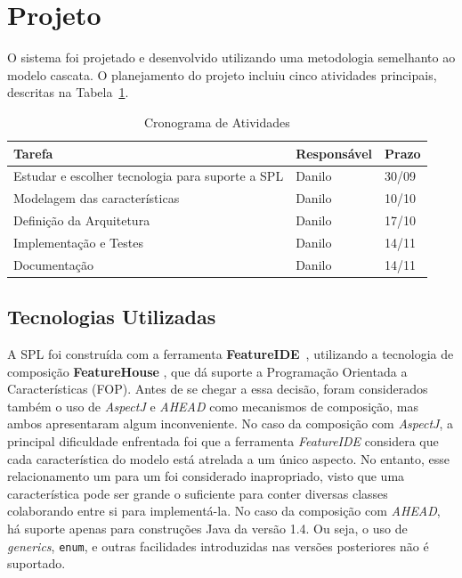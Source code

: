 \documentclass[12pt]{article}
\newcommand{\tra}[1]{\renewcommand{\arraystretch}{#1}}
\begin{document}
\FloatBarrier
\section{Projeto}
\label{sec:design}

O sistema foi projetado e desenvolvido utilizando uma metodologia semelhanto ao modelo cascata. O planejamento do projeto incluiu cinco atividades principais, descritas na Tabela~\ref{tab:activities}.

\begin{table}[htb]\centering
\tra{1.1}
\begin{tabular}{@{}lll@{}}\toprule
\textbf{Tarefa} & \textbf{Responsável} & \textbf{Prazo} \\
\midrule
Estudar e escolher tecnologia para suporte a SPL & Danilo & 30/09 \\
Modelagem das características & Danilo & 10/10 \\
Definição da Arquitetura & Danilo & 17/10 \\
Implementação e Testes & Danilo & 14/11 \\
Documentação & Danilo & 14/11 \\
\bottomrule
\end{tabular}
\caption{Cronograma de Atividades}
\label{tab:activities}
\end{table}


\subsection{Tecnologias Utilizadas}

A SPL foi construída com a ferramenta \textbf{FeatureIDE}~\cite{kastner2009featureide}, utilizando a tecnologia de composição \textbf{FeatureHouse} \cite{apel2009featurehouse}, que dá suporte a Programação Orientada a Características (FOP). %
Antes de se chegar a essa decisão, foram considerados também o uso de \emph{AspectJ} e \emph{AHEAD} como mecanismos de composição, mas ambos apresentaram algum inconveniente. No caso da composição com \emph{AspectJ}, a principal dificuldade enfrentada foi que a ferramenta \emph{FeatureIDE} considera que cada característica do modelo está atrelada a um único aspecto. No entanto, esse relacionamento um para um foi considerado inapropriado, visto que uma característica pode ser grande o suficiente para conter diversas classes colaborando entre si para implementá-la.
No caso da composição com \emph{AHEAD}, há suporte apenas para construções Java da versão 1.4. Ou seja, o uso de \emph{generics}, \texttt{enum}, e outras facilidades introduzidas nas versões posteriores não é suportado.
\end{document}
